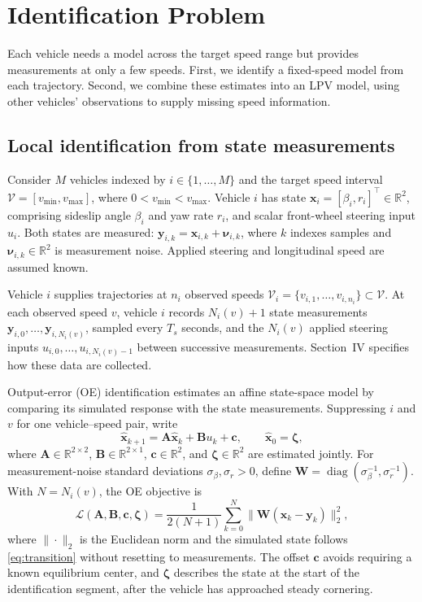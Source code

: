 \documentclass[conference]{IEEEtran}
\newcommand{\R}{\mathbb{R}}
\newcommand{\rev}[1]{\textcolor{revisiongreen}{#1}}
\newcommand{\revred}[1]{\textcolor{revisionred}{#1}}
\newcommand{\bs}[1]{\boldsymbol{#1}}
\begin{document}
\section{Identification Problem}
\begingroup
\rev{Each vehicle needs a model across the target speed range but provides
measurements at only a few speeds. First, we identify a fixed-speed model}
from \rev{each trajectory. Second, we combine these estimates into} an LPV \rev{model,
using other vehicles}' \rev{observations to supply missing speed} information.

\subsection{Local identification from \rev{state measurements}}
Consider $M$ vehicles indexed by $i\in\{1,\ldots,M\}$ and the target
speed interval $\mathcal V=[v_{\min},v_{\max}]$, \rev{where}
$0<v_{\min}<v_{\max}$. Vehicle $i$ has state
$\bs{x}_i=[\beta_i,r_i]^\top\in\R^2$, comprising sideslip angle $\beta_i$
and yaw rate $r_i$, and \rev{scalar} front-wheel steering input \rev{$u_i$.
Both states} are \rev{measured}:
$\bs{y}_{i,k}=\bs{x}_{i,k}+\bs{\nu}_{i,k}$, where $k$ indexes samples
\rev{and $\bs{\nu}_{i,k}\in\R^2$ is measurement noise}.
Applied steering and longitudinal speed are assumed known.

Vehicle $i$ supplies trajectories at $n_i$ observed speeds
$\mathcal V_i=\{v_{i,1},\ldots,v_{i,n_i}\}\subset\mathcal V$.
\revred{At each observed speed $v$, vehicle $i$ records $N_i(v)+1$ state measurements}
$\bs{y}_{i,0},\ldots,\bs{y}_{i,N_i(v)}$, \revred{sampled every $T_s$ seconds,
and the $N_i(v)$ applied steering inputs}
$u_{i,0},\ldots,u_{i,N_i(v)-1}$ \revred{between successive measurements}.
Section~IV specifies \rev{how these data are collected}.

\rev{Output-error (OE) identification estimates an} affine \rev{state-space} model by
comparing its simulated \rev{response} with the \rev{state} measurements. \rev{Suppressing
$i$ and $v$ for} one vehicle--speed pair, write
\begingroup\color{revisiongreen}
\begin{equation}
 \widehat{\bs{x}}_{k+1}=\bs{A}\widehat{\bs{x}}_k+\bs{B}u_k+\bs{c},
 \qquad \widehat{\bs{x}}_0=\bs{\zeta},
 \label{eq:transition}
\end{equation}
\endgroup
where $\bs{A}\in\R^{2\times2}$, $\bs{B}\in\R^{2\times1}$,
$\bs{c}\in\R^2$, and $\bs{\zeta}\in\R^2$ are \rev{estimated} jointly.
\rev{For measurement-noise} standard deviations \rev{$\sigma_\beta,\sigma_r>0$, define
$\bs{W}=\operatorname{diag}(\sigma_\beta^{-1},\sigma_r^{-1})$}.
With $N=N_i(v)$, the \rev{OE} objective is
\begingroup\color{revisiongreen}
\begin{equation}
 \mathcal L(\bs{A},\bs{B},\bs{c},\bs{\zeta})=
 \frac{1}{2(N+1)}\sum_{k=0}^{N}
 \|\bs{W}(\widehat{\bs{x}}_k-\bs{y}_k)\|_2^2,
 \label{eq:local}
\end{equation}
\endgroup
where $\|\cdot\|_2$ is the Euclidean norm and \rev{the simulated state} follows
\eqref{eq:transition} without resetting to \rev{measurements}.
The offset $\bs{c}$ avoids requiring a known equilibrium center, \rev{and
$\bs{\zeta}$ describes the state} at the \rev{start} of the \rev{identification segment,
after the vehicle has approached steady cornering}.
\end{document}

